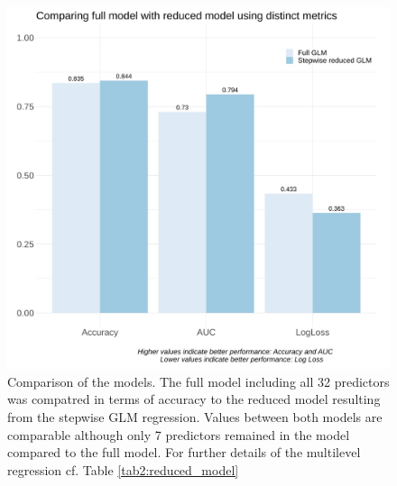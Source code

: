 \documentclass[a4paper,oneside,11pt,english]{scrartcl}
\begin{document}
\begin{figure}[h!]
	\includegraphics[width=.84\textwidth]{fig4.model.comparison.v1.0.jpg}
	\caption{Comparison of the models. The full model including all 32 predictors was compatred in terms of accuracy to the reduced model resulting from the stepwise \textsc{GLM} regression. Values between both models are comparable although only 7 predictors remained in the model compared to the full model. For further details of the multilevel regression cf. Table \ref{tab2:reduced_model}}
	\label{fig4:comparison_models}
\end{figure}
\end{document}

